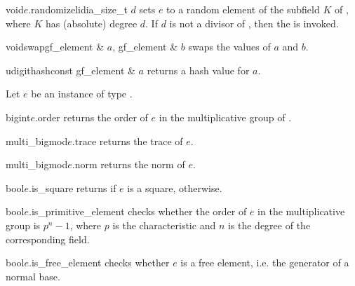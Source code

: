 \begin{fcode}{void}{$e$.randomize}{lidia_size_t $d$}
  sets $e$ to a random element of the subfield $K$ of , where $K$ has
  (absolute) degree $d$.  If $d$ is not a divisor of ,
  then the \LEH is invoked.
\end{fcode}

\begin{fcode}{void}{swap}{gf_element & $a$, gf_element & $b$}
  swaps the values of $a$ and $b$.
\end{fcode}

\begin{fcode}{udigit}{hash}{const gf_element & $a$}
  returns a hash value for $a$.
\end{fcode}



\HIGH

Let $e$ be an instance of type .

\begin{cfcode}{bigint}{$e$.order}{}
  returns the order of $e$ in the multiplicative group of .
\end{cfcode}

\begin{cfcode}{multi_bigmod}{$e$.trace}{}
  returns the trace of $e$.
\end{cfcode}

\begin{cfcode}{multi_bigmod}{$e$.norm}{}
  returns the norm of $e$.
\end{cfcode}

\begin{cfcode}{bool}{$e$.is_square}{}
  returns \TRUE if $e$ is a square, \FALSE otherwise.
\end{cfcode}

\begin{cfcode}{bool}{$e$.is_primitive_element}{}
  checks whether the order of $e$ in the multiplicative group is $p^n-1$, where $p$ is the
  characteristic and $n$ is the degree of the corresponding field.
\end{cfcode}

\begin{cfcode}{bool}{$e$.is_free_element}{}
  checks whether $e$ is a free element, i.e. the generator of a normal base.
\end{cfcode}

